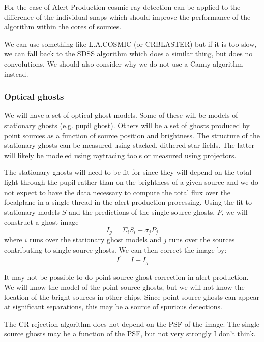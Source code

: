 For the case of Alert Production cosmic ray detection can be applied to the difference of the individual snaps which should improve the performance of the algorithm within the cores of sources.


\begin{note}
We can use something like L.A.COSMIC (or CRBLASTER) but if it is too slow, we can fall back to the SDSS algorithm which does a similar thing, but does no convolutions.
We should also consider why we do not use a Canny algorithm instead.
\end{note}

\subsubsection{Optical ghosts}
We will have a set of optical ghost models.  Some of these will be models of stationary ghosts (e.g. pupil
ghost). Others will be a set of ghosts produced by point sources as a function of source position and
brightness. The structure of the stationary ghosts can be measured using stacked, dithered star fields.  The latter will likely be modeled using raytracing tools or measured using projectors.

The stationary ghosts will need to be fit for since they will depend on the total light through the pupil rather than on the brightness of a given source and we do not expect to have the data necessary to compute the total flux over the focalplane in a single thread in the alert production processing.  Using the fit to stationary models $S$ and the predictions of the single source ghosts, $P$, we will construct a ghost image
\[
I_g = \Sigma_i S_i + \sigma_j P_{j}
\]
where $i$ runs over the stationary ghost models and $j$ runs over the sources contributing to single source ghosts.  We can then correct the image by:
\[
I^\prime = I - I_g
\]

\begin{note}
It may not be possible to do point source ghost correction in alert production.  We will know the model of the
point source ghosts, but we will not know the location of the bright sources in other chips.  Since point
source ghosts can appear at significant separations, this may be a source of spurious detections.
\end{note}

\begin{note}
The CR rejection algorithm does not depend on the PSF of the image.  The single source ghosts may be a function of the PSF, but not very strongly I don't think.
\end{note}

